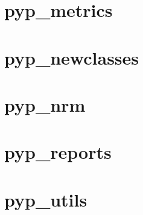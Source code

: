 \section{pyp\_metrics}


\section{pyp\_newclasses}


\section{pyp\_nrm}


\section{pyp\_reports}


\section{pyp\_utils}
